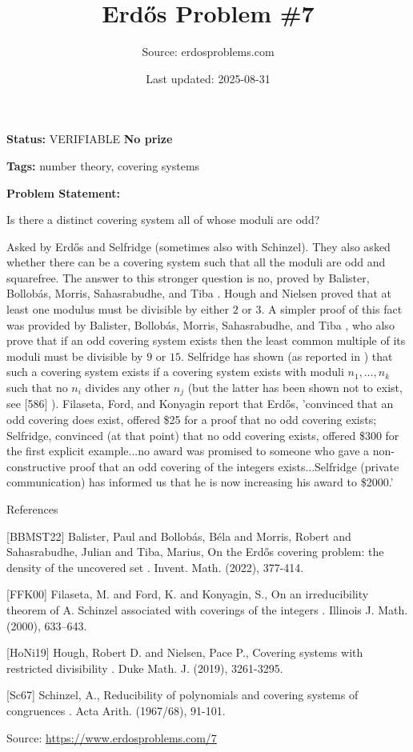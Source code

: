 \documentclass{article}
\title{Erd\H{o}s Problem \#7}
\date{Last updated: 2025-08-31}
\author{Source: erdosproblems.com}
\begin{document}
\maketitle

\noindent\textbf{Status:} VERIFIABLE \quad \textbf{No prize}

\noindent\textbf{Tags:} number theory, covering systems

\medskip

\noindent\textbf{Problem Statement:}

Is there a distinct covering system all of whose moduli are odd?




Asked by Erd\H{o}s and Selfridge (sometimes also with Schinzel). They also asked whether there can be a covering system such that all the moduli are odd and squarefree. The answer to this stronger question is no, proved by Balister, Bollob\'{a}s, Morris, Sahasrabudhe, and Tiba \cite{BBMST22}. Hough and Nielsen \cite{HoNi19} proved that at least one modulus must be divisible by either $2$ or $3$. A simpler proof of this fact was provided by Balister, Bollob\'{a}s, Morris, Sahasrabudhe, and Tiba \cite{BBMST22}, who also prove that if an odd covering system exists then the least common multiple of its moduli must be divisible by $9$ or $15$. Selfridge has shown (as reported in \cite{Sc67}) that such a covering system exists if a covering system exists with moduli $n_1,\ldots,n_k$ such that no $n_i$ divides any other $n_j$ (but the latter has been shown not to exist, see [586] ). Filaseta, Ford, and Konyagin \cite{FFK00} report that Erd\H{o}s, 'convinced that an odd covering does exist, offered \$25 for a proof that no odd covering exists; Selfridge, convinced (at that point) that no odd covering exists, offered \$300 for the first explicit example...no award was promised to someone who gave a non-constructive proof that an odd covering of the integers exists...Selfridge (private communication) has informed us that he is now increasing his award to \$2000.'




References

[BBMST22] Balister, Paul and Bollob\'{a}s, B\'{e}la and Morris, Robert and Sahasrabudhe, Julian and Tiba, Marius, On the Erd\H{o}s covering problem: the density of the uncovered set . Invent. Math. (2022), 377-414.

[FFK00] Filaseta, M. and Ford, K. and Konyagin, S., On an irreducibility theorem of {A}. Schinzel associated with coverings of the integers . Illinois J. Math. (2000), 633--643.

[HoNi19] Hough, Robert D. and Nielsen, Pace P., Covering systems with restricted divisibility . Duke Math. J. (2019), 3261-3295.

[Sc67] Schinzel, A., Reducibility of polynomials and covering systems of congruences . Acta Arith. (1967/68), 91-101.

\bigskip
\noindent\small{Source: \url{https://www.erdosproblems.com/7}}
\end{document}
